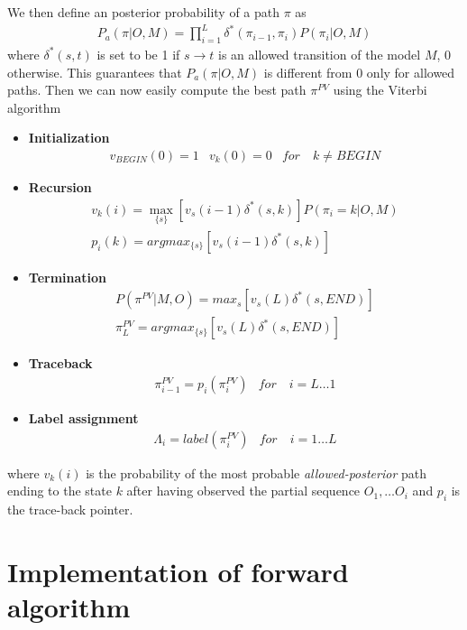 \documentclass[11pt,english]{article}
\begin{document}
We then define an posterior probability of a path $\pi$ as 
\begin{eqnarray}
P_a(\pi|O,M)=\prod_{i=1}^L\delta^*(\pi_{i-1},\pi_i)P(\pi_i|O,M)
\end{eqnarray}
where $\delta^*(s,t)$ is set to be 1 if $s \rightarrow t$
is an allowed transition of the model $M$, 0 otherwise. 
This guarantees that $P_{a}(\pi|O,M)$ is different from 0 only for 
allowed paths. Then we can now easily compute the best path 
$\pi^{PV}$ using the Viterbi algorithm
\begin{itemize}
\item {\bf Initialization}
\begin{eqnarray*}
v_{BEGIN}(0)=1 & v_{k}(0)=0 & for \quad k \neq BEGIN
\end{eqnarray*}

\item {\bf Recursion}
\begin{eqnarray*}
v_{k}(i) = \max_{\{s\}}[v_{s}(i-1)\delta^*(s,k)] P(\pi_i=k|O,M) \\
p_i(k)= argmax_{\{s\}}[v_{s}(i-1)\delta^*(s,k)] 
\end{eqnarray*}

\item {\bf Termination}
\begin{eqnarray*}
P(\pi^{PV} |M,O) = max_{s}[v_s(L)\delta^*(s,END)] \\
\pi^{PV}_L=argmax_{\{s\}}[v_s(L)\delta^*(s,END)]
\end{eqnarray*}

\item {\bf Traceback}
\begin{eqnarray*}
\pi^{PV}_{i-1}=p_i(\pi^{PV}_{i}) & for \quad i=L \dots 1
\end{eqnarray*}
\item {\bf Label assignment}
\begin{eqnarray*}
\Lambda_i=label(\pi^{PV}_i) & for \quad i=1 \dots L
\end{eqnarray*}
\end{itemize}
where $v_k(i)$ is the probability of the most probable {\em allowed-posterior} 
path ending to the state $k$ after having observed the partial 
sequence $O_1,\dots O_i$ and $p_i$ is the trace-back pointer.


\section{Implementation of forward algorithm}
\end{document}
